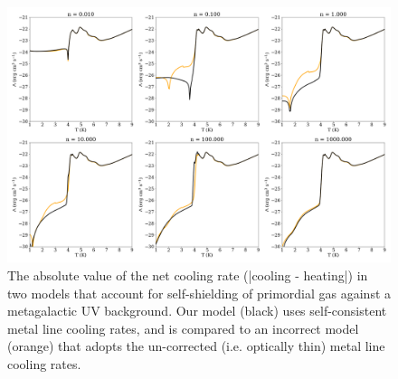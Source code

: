 \documentclass[twocolumn]{aastex61}
\begin{document}
\begin{figure}
\centering
\includegraphics[width=0.95\linewidth]{cooling_model_comparison}
\caption{The absolute value of the net cooling rate (|cooling - heating|) in two models that account for self-shielding of primordial gas against a metagalactic UV background. Our model (black) uses self-consistent metal line cooling rates, and is compared to an incorrect model (orange) that adopts the un-corrected (i.e. optically thin) metal line cooling rates.}
\label{fig:cooling comparison}
\end{figure}









\end{document}
